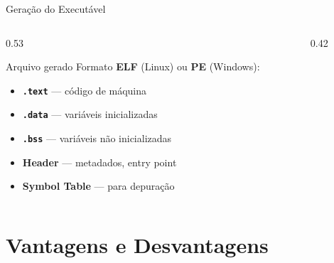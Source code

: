 \documentclass[aspectratio=169, 11pt]{beamer}
\begin{document}
\begin{frame}{Geração do Executável}
  \begin{columns}[T]
    \begin{column}{0.53\textwidth}
      \begin{block}{Arquivo gerado}
        Formato \textbf{ELF} (Linux) ou \textbf{PE} (Windows):
      \end{block}
      \vspace{0.2cm}
      \begin{itemize}
        \item \textbf{\texttt{.text}} — código de máquina
        \item \textbf{\texttt{.data}} — variáveis inicializadas
        \item \textbf{\texttt{.bss}} — variáveis não inicializadas
        \item \textbf{Header} — metadados, entry point
        \item \textbf{Symbol Table} — para depuração
      \end{itemize}
    \end{column}
    \begin{column}{0.42\textwidth}
      \begin{center}
      \end{center}
    \end{column}
  \end{columns}
\end{frame}

\section{Vantagens e Desvantagens}
\end{document}
